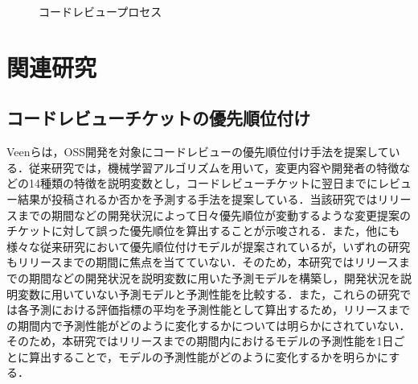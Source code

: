 \documentclass[11pt]{jreport}
\begin{document}
\begin{figure}[h]
\begin{center}
\caption{コードレビュープロセス}
\label{fig:codereviewprocess}
\end{center}
\end{figure}

\section{関連研究}
\subsection{コードレビューチケットの優先順位付け}
Veen\cite{prioritizer}らは，OSS開発を対象にコードレビューの優先順位付け手法を提案している．従来研究では，機械学習アルゴリズムを用いて，変更内容や開発者の特徴などの14種類の特徴を説明変数とし，コードレビューチケットに翌日までにレビュー結果が投稿されるか否かを予測する手法を提案している．当該研究ではリリースまでの期間などの開発状況によって日々優先順位が変動するような変更提案のチケットに対して誤った優先順位を算出することが示唆される．また，他にも様々な従来研究\cite{review_prioritize_pineapple}\cite{prioritize_azeem}\cite{prioritize_fan}において優先順位付けモデルが提案されているが，いずれの研究もリリースまでの期間に焦点を当てていない．そのため，本研究ではリリースまでの期間などの開発状況を説明変数に用いた予測モデルを構築し，開発状況を説明変数に用いていない予測モデルと予測性能を比較する．また，これらの研究\cite{prioritizer}\cite{review_prioritize_pineapple}\cite{prioritize_azeem}\cite{prioritize_fan}では各予測における評価指標の平均を予測性能として算出するため，リリースまでの期間内で予測性能がどのように変化するかについては明らかにされていない．そのため，本研究ではリリースまでの期間内におけるモデルの予測性能を1日ごとに算出することで，モデルの予測性能がどのように変化するかを明らかにする．
\end{document}
